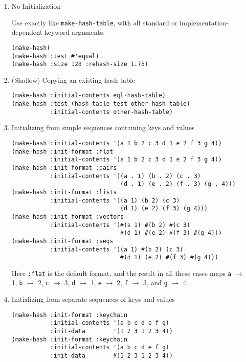 \documentclass[11pt]{article}
\begin{document}
\begin{enumerate}
\item No Initialization 

     Use exactly like \texttt{make-hash-table}, with all standard or
     implementation-dependent keyword arguments.


\begin{verbatim}
(make-hash)
(make-hash :test #'equal)
(make-hash :size 128 :rehash-size 1.75)
\end{verbatim}
\item (Shallow) Copying an existing hash table


\begin{verbatim}
(make-hash :initial-contents eql-hash-table)
(make-hash :test (hash-table-test other-hash-table)
           :initial-contents other-hash-table)
\end{verbatim}
\item Initializing from simple sequences containing keys and values


\begin{verbatim}
(make-hash :initial-contents '(a 1 b 2 c 3 d 1 e 2 f 3 g 4))
(make-hash :init-format :flat
           :initial-contents '(a 1 b 2 c 3 d 1 e 2 f 3 g 4))
(make-hash :init-format :pairs
           :initial-contents '((a . 1) (b . 2) (c . 3)
                               (d . 1) (e . 2) (f . 3) (g . 4)))
(make-hash :init-format :lists
           :initial-contents '((a 1) (b 2) (c 3)
                               (d 1) (e 2) (f 3) (g 4)))
(make-hash :init-format :vectors
           :initial-contents '(#(a 1) #(b 2) #(c 3)
                               #(d 1) #(e 2) #(f 3) #(g 4)))
(make-hash :init-format :seqs
           :initial-contents '((a 1) #(b 2) (c 3)
                               #(d 1) (e 2) #(f 3) #(g 4)))
\end{verbatim}




     Here \texttt{:flat} is the default format, and the result in all these
     cases maps \texttt{a} $\to$ 1, \texttt{b} $\to$ 2, \texttt{c} $\to$ 3, \texttt{d} $\to$ 1, \texttt{e} $\to$ 2,
     \texttt{f} $\to$ 3, and \texttt{g} $\to$ 4.
\item Initializing from separate sequences of keys and values


\begin{verbatim}
(make-hash :init-format :keychain
           :initial-contents '(a b c d e f g)
           :init-data        '(1 2 3 1 2 3 4))
(make-hash :init-format :keychain
           :initial-contents '(a b c d e f g)
           :init-data        #(1 2 3 1 2 3 4))
\end{verbatim}





\end{enumerate}
\end{document}
